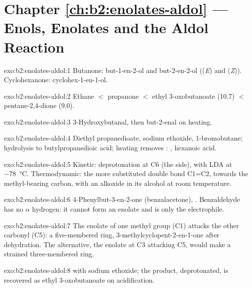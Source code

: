 \section*{Chapter \ref{ch:b2:enolates-aldol} --- Enols, Enolates and the Aldol Reaction}

\begin{solution}{exo:b2:enolates-aldol:1}
Butanone: but-1-en-2-ol  and but-2-en-2-ol  ((\textit{E}) and
(\textit{Z})). Cyclohexanone: cyclohex-1-en-1-ol.
\end{solution}

\begin{solution}{exo:b2:enolates-aldol:2}
Ethane $<$ propanone $<$ ethyl 3-oxobutanoate (10.7) $<$ pentane-2,4-dione (9.0).
\end{solution}

\begin{solution}{exo:b2:enolates-aldol:3}
3-Hydroxybutanal, then but-2-enal on heating.
\end{solution}

\begin{solution}{exo:b2:enolates-aldol:4}
Diethyl propanedioate, sodium ethoxide, 1-bromobutane; hydrolysis to butylpropanedioic acid;
heating removes : , hexanoic acid.
\end{solution}

\begin{solution}{exo:b2:enolates-aldol:5}
Kinetic: deprotonation at C6 (the  side), with LDA at \qty{-78}{\degreeCelsius}. Thermodynamic:
the more substituted double bond C1=C2, towards the methyl-bearing carbon, with an alkoxide in its
alcohol at room temperature.
\end{solution}

\begin{solution}{exo:b2:enolates-aldol:6}
4-Phenylbut-3-en-2-one (benzalacetone), . Benzaldehyde has no $\alpha$ hydrogen: it
cannot form an enolate and is only the electrophile.
\end{solution}

\begin{solution}{exo:b2:enolates-aldol:7}
The enolate of one methyl group (C1) attacks the other carbonyl (C5): a five-membered ring,
3-methylcyclopent-2-en-1-one after dehydration. The alternative, the enolate at C3 attacking C5,
would make a strained three-membered ring.
\end{solution}

\begin{solution}{exo:b2:enolates-aldol:8}
 with sodium ethoxide; the product, deprotonated, is
recovered as ethyl 3-oxobutanoate on acidification.
\end{solution}

